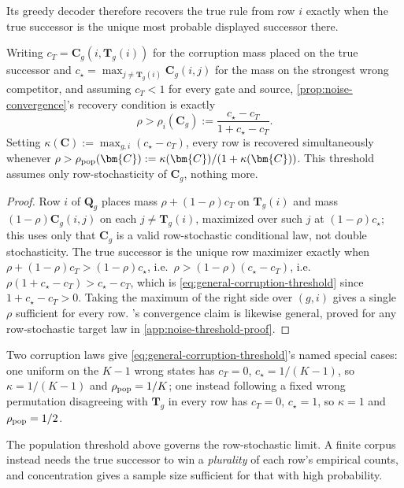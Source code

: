 Its greedy decoder therefore recovers the true rule from row $i$ exactly
when the true successor is the unique most probable displayed successor
there.

\begin{theorem}
\label{cor:noise-threshold}
Writing $c_T=\bm{C}_g(i,\bm{T}_g(i))$ for the corruption mass placed on the
true successor and $c_\star=\max_{j\ne \bm{T}_g(i)}\bm{C}_g(i,j)$ for the mass
on the strongest wrong competitor, and assuming $c_T<1$ for every gate and
source, \cref{prop:noise-convergence}'s recovery condition is exactly
\begin{equation}
 \rho>\rho_i(\bm{C}_g):=\frac{c_\star-c_T}{1+c_\star-c_T}.
 \label{eq:general-corruption-threshold}
\end{equation}
Setting $\kappa(\bm{C}):=\max_{g,i}(c_\star-c_T)$, every row is recovered
simultaneously whenever $\rho>\rho_{\rm pop}(\bm{C}):=\kappa(\bm{C})/(1+\kappa(\bm{C}))$.
This threshold assumes only row-stochasticity of $\bm{C}_g$, nothing more.
\end{theorem}
\begin{proof}
Row $i$ of $\bm{Q}_g$ places mass $\rho+(1-\rho)c_T$ on $\bm{T}_g(i)$ and mass
$(1-\rho)\bm{C}_g(i,j)$ on each $j\ne \bm{T}_g(i)$, maximized over such $j$ at
$(1-\rho)c_\star$; this uses only that $\bm{C}_g$ is a valid row-stochastic
conditional law, not double stochasticity. The true successor is the
unique row maximizer exactly when $\rho+(1-\rho)c_T>(1-\rho)c_\star$, i.e.\
$\rho>(1-\rho)(c_\star-c_T)$, i.e.\ $\rho(1+c_\star-c_T)>c_\star-c_T$, which
is \cref{eq:general-corruption-threshold} since $1+c_\star-c_T>0$. Taking
the maximum of the right side over $(g,i)$ gives a single $\rho$ sufficient
for every row. \Cref{prop:noise-convergence}'s convergence claim is
likewise general, proved for any row-stochastic target law in
\cref{app:noise-threshold-proof}.
\end{proof}

\begin{corollary}
\label{cor:noise-threshold-cases}
Two corruption laws give \cref{eq:general-corruption-threshold}'s named
special cases: one uniform on the $K-1$ wrong states has $c_T=0$,
$c_\star=1/(K-1)$, so $\kappa=1/(K-1)$ and $\rho_{\rm pop}=1/K$; one instead
following a fixed wrong permutation disagreeing with $\bm{T}_g$ in every row
has $c_T=0$, $c_\star=1$, so $\kappa=1$ and $\rho_{\rm pop}=1/2$.
\end{corollary}

The population threshold above governs the row-stochastic limit. A finite
corpus instead needs the true successor to win a \emph{plurality} of each
row's empirical counts, and concentration gives a sample size sufficient
for that with high probability.


